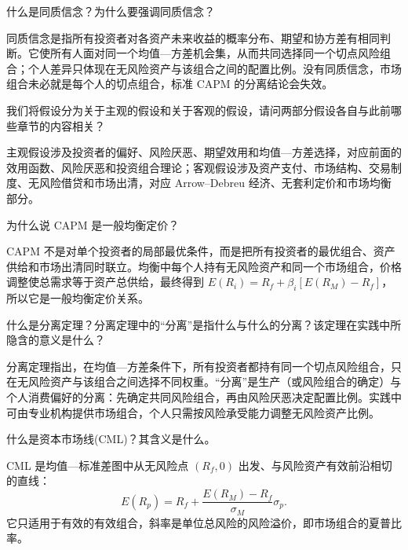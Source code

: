 
\begin{problem}
 什么是同质信念？为什么要强调同质信念？
\end{problem}
\begin{solution}
同质信念是指所有投资者对各资产未来收益的概率分布、期望和协方差有相同判断。它使所有人面对同一个均值—方差机会集，从而共同选择同一个切点风险组合；个人差异只体现在无风险资产与该组合之间的配置比例。没有同质信念，市场组合未必就是每个人的切点组合，标准 CAPM 的分离结论会失效。
\end{solution}
\begin{problem}
 我们将假设分为关于主观的假设和关于客观的假设，请问两部分假设各自与此前哪些章节的内容相关？
\end{problem}
\begin{solution}
主观假设涉及投资者的偏好、风险厌恶、期望效用和均值—方差选择，对应前面的效用函数、风险厌恶和投资组合理论；客观假设涉及资产支付、市场结构、交易制度、无风险借贷和市场出清，对应 Arrow--Debreu 经济、无套利定价和市场均衡部分。
\end{solution}
\begin{problem}
 为什么说 CAPM 是一般均衡定价？
\end{problem}
\begin{solution}
CAPM 不是对单个投资者的局部最优条件，而是把所有投资者的最优组合、资产供给和市场出清同时联立。均衡中每个人持有无风险资产和同一个市场组合，价格调整使总需求等于资产总供给，最终得到 $E(R_i)=R_f+\beta_i[E(R_M)-R_f]$，所以它是一般均衡定价关系。
\end{solution}
\begin{problem}
 什么是分离定理？分离定理中的“分离”是指什么与什么的分离？该定理在实践中所隐含的意义是什么？
\end{problem}
\begin{solution}
分离定理指出，在均值—方差条件下，所有投资者都持有同一个切点风险组合，只在无风险资产与该组合之间选择不同权重。“分离”是生产（或风险组合的确定）与个人消费偏好的分离：先确定共同风险组合，再由风险厌恶决定配置比例。实践中可由专业机构提供市场组合，个人只需按风险承受能力调整无风险资产比例。
\end{solution}
\begin{problem}
 什么是资本市场线(CML)？其含义是什么。
\end{problem}
\begin{solution}
CML 是均值—标准差图中从无风险点 $(R_f,0)$ 出发、与风险资产有效前沿相切的直线：
\[
E(R_p)=R_f+\frac{E(R_M)-R_f}{\sigma_M}\sigma_p.
\]
它只适用于有效的有效组合，斜率是单位总风险的风险溢价，即市场组合的夏普比率。
\end{solution}
